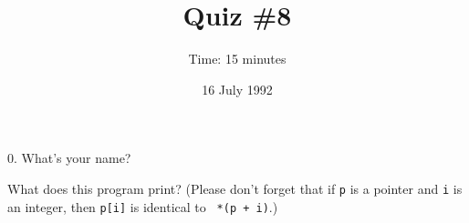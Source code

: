 



\topmargin -0.5in
\textheight 9in

\title{Quiz \#8}
\date{16 July 1992}
\author{Time: 15 minutes}


\maketitle

0. What's your name?

\vspace{.5in}

What does this program print?  (Please don't forget that if {\tt p} is a
pointer and {\tt i} is an integer, then {\tt p[i]} is identical to {\tt
*(p + i)}.)



